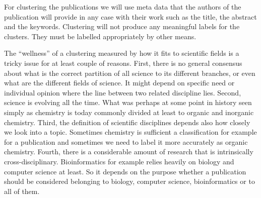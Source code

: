 For clustering the publications we will use meta data that the authors 
of the publication will provide in any case with their work such 
as the title, the abstract and the keywords. 
Clustering will not produce any meaningful labels for the 
clusters. They must be labelled appropriately by other means. 

The ``wellness'' of a clustering measured by how it fits to 
scientific fields is a tricky issue for at least couple of 
reasons.
First, there is no general consensus about what is the correct 
partition of all science to its different branches, or even what
are the different fields of science. It might depend 
on specific need or individual opinion where the line between two 
related discipline lies.
Second, science is evolving all the time. What was perhaps at some 
point in history seen simply as chemistry is today commonly 
divided at least to organic and inorganic chemistry.
Third, the definition of scientific disciplines depends also how 
closely we look into a topic. Sometimes chemistry is sufficient a
classification for example for a publication and sometimes we need 
to label it more accurately as organic chemistry.
Fourth, there is a considerable amount of research that is 
intrinsically cross-disciplinary. Bioinformatics for example relies
heavily on biology and computer science at least. So it depends on the 
purpose whether a publication should be considered belonging to
biology, computer science, bioinformatics or to all of them.




